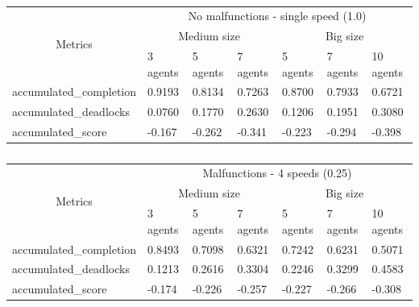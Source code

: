 \documentclass[11pt, a4paper, hidelinks]{report}
\begin{document}
\begin{table}[]
\begin{tabular}{|l|l|l|l|l|l|l|l|}
\hline
\multicolumn{1}{|c|}{\multirow{3}{*}{Metrics}} & \multicolumn{7}{c|}{No malfunctions - single speed (1.0)}                                 \\ \cline{2-8}
\multicolumn{1}{|c|}{}                         & \multicolumn{3}{c|}{Medium size} & \multicolumn{4}{c|}{Big size}                          \\ \cline{2-8}
\multicolumn{1}{|c|}{}                         & 3 agents  & 5 agents  & 7 agents & 5 agents  & 7 agents  & \multicolumn{2}{l|}{10 agents} \\ \hline
accumulated\_completion                        & 0.9193    & 0.8134    & 0.7263   & 0.8700    & 0.7933    & \multicolumn{2}{l|}{0.6721}    \\ \hline
accumulated\_deadlocks                         & 0.0760    & 0.1770    & 0.2630   & 0.1206    & 0.1951    & \multicolumn{2}{l|}{0.3080}    \\ \hline
accumulated\_score                             & -0.167    & -0.262    & -0.341   & -0.223    & -0.294    & \multicolumn{2}{l|}{-0.398}    \\ \hline
\end{tabular}
\caption{}
\label{tab:evaluation1}
\end{table}

\begin{table}[]
\begin{tabular}{|l|l|l|l|l|l|l|l|}
\hline
\multicolumn{1}{|c|}{\multirow{3}{*}{Metrics}} & \multicolumn{7}{c|}{Malfunctions - 4 speeds (0.25)}                                       \\ \cline{2-8}
\multicolumn{1}{|c|}{}                         & \multicolumn{3}{c|}{Medium size} & \multicolumn{4}{c|}{Big size}                          \\ \cline{2-8}
\multicolumn{1}{|c|}{}                         & 3 agents  & 5 agents  & 7 agents & 5 agents  & 7 agents  & \multicolumn{2}{l|}{10 agents} \\ \hline
accumulated\_completion                        & 0.8493    & 0.7098    & 0.6321   & 0.7242    & 0.6231    & \multicolumn{2}{l|}{0.5071}    \\ \hline
accumulated\_deadlocks                         & 0.1213    & 0.2616    & 0.3304   & 0.2246    & 0.3299    & \multicolumn{2}{l|}{0.4583}    \\ \hline
accumulated\_score                             & -0.174    & -0.226    & -0.257   & -0.227    & -0.266    & \multicolumn{2}{l|}{-0.308}    \\ \hline
\end{tabular}
\caption{}
\label{tab:evaluation2}
\end{table}
\end{document}
